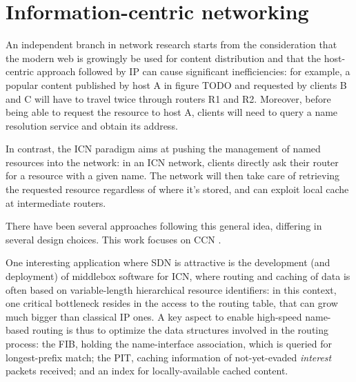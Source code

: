 \documentclass[12pt,a4paper,twoside]{book}
\begin{document}
\section{Information-centric networking}
An independent branch in network research starts from the consideration that the modern web is growingly be used for content distribution and that the host-centric approach followed by IP can cause significant inefficiencies: for example, a popular content published by host A in figure TODO
and requested by clients B and C will have to travel twice through routers R1 and R2. Moreover, before being able to request the resource to host A, clients will need to query a name resolution service and obtain its address.

In contrast, the \gls{ICN} paradigm aims at pushing the management of named resources into the network: in an ICN network, clients directly ask their router for a resource with a given name. The network will then take care of retrieving the requested resource regardless of where it's stored, and can exploit local cache at intermediate routers.


There have been several approaches following this general idea, differing in several design choices. This work focuses on \gls{CCN} \cite{ccn}.


One interesting application where SDN is attractive is the development (and deployment) of middlebox software for \gls{ICN}, where routing and caching of data is often based on variable-length hierarchical resource identifiers: in this context, one critical bottleneck resides in the access to the routing table, that can grow much bigger than classical IP ones.
A key aspect to enable high-speed name-based routing is thus to optimize the data structures involved in the routing process: the \gls{FIB}, holding the name-interface association, which is queried for longest-prefix match; the \gls{PIT}, caching information of not-yet-evaded \emph{interest} packets received; and an index for locally-available cached content.
\end{document}
